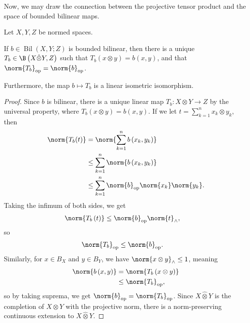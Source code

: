 Now, we may draw the connection between the projective tensor product and the space of bounded bilinear maps.
\begin{proposition}
  Let $X,Y,Z$ be normed spaces.\newline

  If $b\in \operatorname{Bil}\left( X,Y;Z \right)$ is bounded bilinear, then there is a unique $T_{b}\in \B\left( X\hat\otimes Y,Z \right)$ such that $T_b\left( x\otimes y \right)= b\left( x,y \right)$, and that $\norm{T_{b}}_{\op} = \norm{b}_{\op}$.\newline

  Furthermore, the map $b\mapsto T_b$ is a linear isometric isomorphism.
\end{proposition}
\begin{proof}
  Since $b$ is bilinear, there is a unique linear map $T_b\colon X\otimes Y \rightarrow Z$ by the universal property, where $T_b\left( x\otimes y \right) = b\left( x,y \right)$. If we let $t = \sum_{k=1}^{n}x_k\otimes y_k$, then
  \begin{align*}
    \norm{T_b(t)} &= \norm{\sum_{k=1}^{n}b\left( x_k,y_k \right)}\\
                  &\leq \sum_{k=1}^{n}\norm{b\left( x_k,y_k \right)}\\
                  &\leq \sum_{k=1}^{n}\norm{b}_{\op}\norm{x_k}\norm{y_k}.
  \end{align*}
  Taking the infimum of both sides, we get
  \begin{align*}
    \norm{T_b\left( t \right)} &\leq \norm{b}_{\op}\norm{t}_{\wedge},
  \end{align*}
  so
  \begin{align*}
    \norm{T_b}_{\op} &\leq \norm{b}_{\op}.
  \end{align*}
  Similarly, for $x\in B_X$ and $y\in B_Y$, we have $\norm{x\otimes y}_{\wedge}\leq 1$, meaning
  \begin{align*}
    \norm{b\left( x,y \right)} &= \norm{T_b\left( x\otimes y \right)}\\
                               &\leq \norm{T_b}_{\op},
  \end{align*}
  so by taking suprema, we get $\norm{b}_{\op} = \norm{T_b}_{\op}$. Since $X\hat\otimes Y$ is the completion of $X\otimes Y$ with the projective norm, there is a norm-preserving continuous extension to $X\hat\otimes Y$.\newline


\end{proof}
